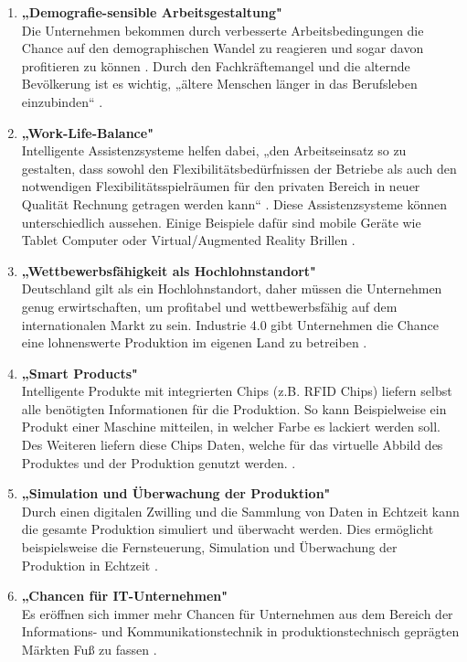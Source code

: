 \begin{enumerate}
	\item \textbf{„Demografie-sensible Arbeitsgestaltung"} \cite[S.20]{12} \\
	Die Unternehmen bekommen durch verbesserte Arbeitsbedingungen die Chance auf den 
	demographischen Wandel zu reagieren und sogar davon profitieren zu können \cite[S.20]{12}. Durch den Fachkräftemangel und die alternde Bevölkerung ist es wichtig,	„ältere Menschen länger in das Berufsleben einzubinden“ \cite{6}. \newpage
	\item \textbf{„Work-Life-Balance"} \cite[S.20]{12} \\
	Intelligente Assistenzsysteme helfen dabei, „den Arbeitseinsatz so zu gestalten, dass sowohl
	den Flexibilitätsbedürfnissen der Betriebe als auch den notwendigen Flexibilitätsspielräumen
	für den privaten Bereich in neuer Qualität Rechnung getragen werden kann“ \cite[S.20]{12}. Diese Assistenzsysteme können unterschiedlich aussehen. Einige Beispiele dafür sind mobile Geräte wie Tablet Computer oder Virtual/Augmented Reality Brillen \cite{6}.
	\item \textbf{„Wettbewerbsfähigkeit als Hochlohnstandort"} \cite[S.20]{12} \\
	Deutschland gilt als ein Hochlohnstandort, daher müssen die Unternehmen genug erwirtschaften, um profitabel und wettbewerbsfähig auf dem internationalen Markt zu sein. Industrie 4.0 gibt Unternehmen die Chance eine lohnenswerte Produktion im eigenen Land zu betreiben \cite[S.20]{12}.
	\item \textbf{„Smart Products"} \cite{6} \\
	Intelligente Produkte mit integrierten Chips (z.B. RFID Chips) liefern selbst alle benötigten
	Informationen für die Produktion. So kann Beispielweise ein Produkt einer Maschine 
	mitteilen, in welcher Farbe es lackiert werden soll. Des Weiteren liefern diese Chips Daten, 
	welche für das virtuelle Abbild des Produktes und der Produktion genutzt werden. \cite{6}.
	\item \textbf{„Simulation und Überwachung der Produktion"} \cite{6} \\
	Durch einen digitalen Zwilling und die Sammlung von Daten in Echtzeit kann die gesamte
	Produktion simuliert und überwacht werden. Dies ermöglicht beispielsweise die
	Fernsteuerung, Simulation und Überwachung der Produktion in Echtzeit \cite{6}.
	\item \textbf{„Chancen für IT-Unternehmen"} \cite[S.7]{2} \\
	Es eröffnen sich immer mehr Chancen für Unternehmen aus dem Bereich der Informations- und Kommunikationstechnik in produktionstechnisch geprägten Märkten Fuß zu fassen \cite[S.7]{2}.
\end{enumerate}


